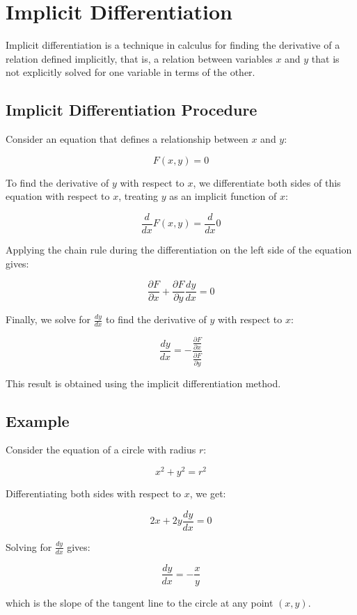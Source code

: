 \chapter{Implicit Differentiation}

Implicit differentiation is a technique in calculus for finding the
derivative of a relation defined implicitly, that is, a relation
between variables $x$ and $y$ that is not explicitly solved for one
variable in terms of the other.

\section{Implicit Differentiation Procedure}

Consider an equation that defines a relationship between $x$ and $y$:

\[
F(x, y) = 0
\]

To find the derivative of $y$ with respect to $x$, we differentiate
both sides of this equation with respect to $x$, treating $y$ as an
implicit function of $x$:

\[
\frac{d}{dx} F(x, y) = \frac{d}{dx} 0
\]

Applying the chain rule during the differentiation on the left side of
the equation gives:

\[
\frac{\partial F}{\partial x} + \frac{\partial F}{\partial y} \frac{dy}{dx} = 0
\]

Finally, we solve for $\frac{dy}{dx}$ to find the derivative of $y$
with respect to $x$:

\[
\frac{dy}{dx} = -\frac{\frac{\partial F}{\partial x}}{\frac{\partial F}{\partial y}}
\]

This result is obtained using the implicit differentiation method.

\section{Example}

Consider the equation of a circle with radius $r$:

\[
x^2 + y^2 = r^2
\]

Differentiating both sides with respect to $x$, we get:

\[
2x + 2y \frac{dy}{dx} = 0
\]

Solving for $\frac{dy}{dx}$ gives:

\[
\frac{dy}{dx} = -\frac{x}{y}
\]

which is the slope of the tangent line to the circle at any point $(x, y)$.
